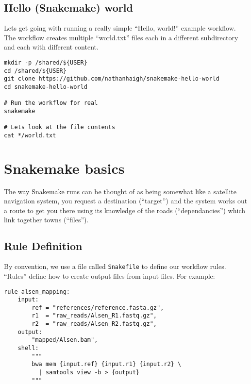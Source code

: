 \subsection{Hello (Snakemake) world}

Lets get going with running a really simple ``Hello, world!'' example workflow. The workflow creates multiple ``world.txt'' files each in a
different subdirectory and each with different content.

\begin{steps}

\begin{lstlisting}
mkdir -p /shared/${USER}
cd /shared/${USER}
git clone https://github.com/nathanhaigh/snakemake-hello-world
cd snakemake-hello-world

# Run the workflow for real
snakemake

# Lets look at the file contents
cat */world.txt
\end{lstlisting}

\end{steps}

\section{Snakemake basics}

The way Snakemake runs can be thought of as being somewhat like a satellite navigation system, you request a destination
(``target'') and the system works out a route to get you there using its knowledge of the roads (``dependancies'') which
link together towns (``files'').

\subsection{Rule Definition}

By convention, we use a file called \texttt{Snakefile} to define our workflow rules. ``Rules'' define how to
create output files from input files. For example:

\begin{lstlisting}
rule alsen_mapping:
	input:
		ref = "references/reference.fasta.gz",
		r1  = "raw_reads/Alsen_R1.fastq.gz",
		r2  = "raw_reads/Alsen_R2.fastq.gz",
	output:
		"mapped/Alsen.bam",
	shell:
		"""
		bwa mem {input.ref} {input.r1} {input.r2} \
		  | samtools view -b > {output}
		"""
\end{lstlisting}


